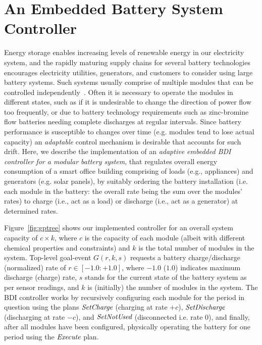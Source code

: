 \section{An Embedded Battery System Controller}\label{sec:application}

\newcommand{\aSet}{\mathname{set}}
\newcommand{\aOperate}{\mathname{operate}}
\newcommand{\aEvaluate}{\mathname{evaluate}}

\newcommand{\pSet}{\mathname{Set*}}
\newcommand{\pSetCharge}{\mathname{SetCharge}}
\newcommand{\pSetDischarge}{\mathname{SetDischarge}}
\newcommand{\pSetNotUsed}{\mathname{SetNotUsed}}
\newcommand{\pExecute}{\mathname{Execute}}

\newcommand{\cSatisfies}{\psi}



Energy storage enables increasing levels of renewable energy in our electricity system, and the rapidly maturing supply chains for several battery technologies encourages electricity utilities, generators, and customers to consider using large battery systems. 
%
Such systems usually comprise of multiple modules that can be controlled independently~\cite{norris02:grid}. Often it is necessary to operate the modules in different states, such as if it is undesirable to change the direction of power flow too frequently, or due to battery technology requirements such as zinc-bromine flow batteries needing complete discharges at regular intervals. Since battery performance is susceptible to changes over time (e.g. modules tend to lose actual capacity) an \emph{adaptable} control mechanism is desirable that accounts for such drift.
%
Here, we describe the implementation of an {\em adaptive embedded BDI controller for a modular battery system}, that regulates overall energy consumption of a smart office building comprising of loads (e.g., appliances) and generators (e.g. solar panels), by suitably ordering the battery installation (i.e. each module in the battery: the overall rate being the sum over the modules' rates) to charge (i.e., act as a load) or discharge (i.e., act as a generator) at determined rates.

Figure~\ref{fig:gptree} shows our implemented controller for an overall system capacity of $c \times k$, where $c$ is the capacity of each module (albeit with different chemical properties and constraints) and $k$ is the total number of modules in the system. Top-level goal-event $G(r,k,s)$ requests a battery charge/discharge (normalized) rate of $r \in [-1.0:+1.0]$, where $-1.0$ ($1.0$) indicates maximum discharge (charge) rate, $s$ stands for the current state of the battery system as per sensor readings, and $k$ is (initially) the number of modules in the system. 
The BDI controller works by recursively configuring each module for the period in question using the plans $\pSetCharge$ (charging at rate $+c$), $\pSetDischarge$ (discharging at rate $-c$), and $\pSetNotUsed$ (disconnected i.e. rate $0$), and finally, after all modules have been configured, physically operating the battery for one period using the $\pExecute$ plan. 

